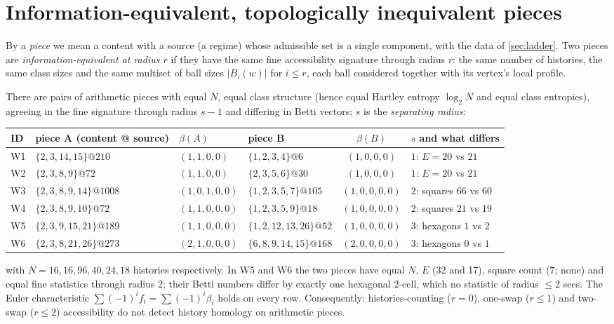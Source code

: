 \section{Information-equivalent, topologically inequivalent pieces}\label{sec:witnesses}
By a \emph{piece} we mean a content with a source (a regime) whose admissible set is a single component, with the data of \cref{sec:ladder}. Two pieces are \emph{information-equivalent at radius $r$} if they have the same fine accessibility signature through radius $r$: the same number of histories, the same class sizes and the same multiset of ball sizes $|B_i(w)|$ for $i\le r$, each ball considered together with its vertex's local profile.
\begin{proposition}\label{prop:witnesses}
There are pairs of arithmetic pieces with equal $N$, equal class structure (hence equal Hartley entropy $\log_2N$ and equal class entropies), agreeing in the fine signature through radius $s-1$ and differing in Betti vectors; $s$ is the \emph{separating radius}:
\begin{center}\footnotesize\setlength{\tabcolsep}{3pt}
\begin{tabular}{@{}llllcl@{}}\toprule
ID & piece A (content @ source) & $\beta(A)$ & piece B & $\beta(B)$ & $s$ and what differs\\ \midrule
W1 & $\{2,3,14,15\}@210$ & $(1,1,0,0)$ & $\{1,2,3,4\}@6$ & $(1,0,0,0)$ & $1$: $E=20$ vs $21$\\
W2 & $\{2,3,8,9\}@72$ & $(1,1,0,0)$ & $\{2,3,5,6\}@30$ & $(1,0,0,0)$ & $1$: $E=20$ vs $21$\\
W3 & $\{2,3,8,9,14\}@1008$ & $(1,0,1,0,0)$ & $\{1,2,3,5,7\}@105$ & $(1,0,0,0,0)$ & $2$: squares $66$ vs $60$\\
W4 & $\{2,3,8,9,10\}@72$ & $(1,1,0,0,0)$ & $\{1,2,3,5,9\}@18$ & $(1,0,0,0,0)$ & $2$: squares $21$ vs $19$\\
W5 & $\{2,3,9,15,21\}@189$ & $(1,1,0,0,0)$ & $\{1,2,12,13,26\}@52$ & $(1,0,0,0,0)$ & $3$: hexagons $1$ vs $2$\\
W6 & $\{2,3,8,21,26\}@273$ & $(2,1,0,0,0)$ & $\{6,8,9,14,15\}@168$ & $(2,0,0,0,0)$ & $3$: hexagons $0$ vs $1$\\ \bottomrule
\end{tabular}
\end{center}
with $N=16,16,96,40,24,18$ histories respectively. In W5 and W6 the two pieces have equal $N$, $E$ (32 and 17), square count ($7$; none) and equal fine statistics through radius $2$; their Betti numbers differ by exactly one hexagonal $2$-cell, which no statistic of radius $\le2$ sees. The Euler characteristic $\sum(-1)^if_i=\sum(-1)^i\beta_i$ holds on every row.
Consequently: histories-counting ($r=0$), one-swap ($r\le1$) and two-swap ($r\le2$) accessibility do not detect history homology on arithmetic pieces.
\end{proposition}

